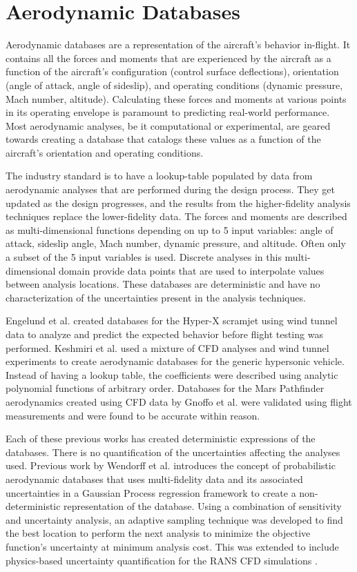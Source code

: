 \section{Aerodynamic Databases} \label{intro_databases}

Aerodynamic databases are a representation of the aircraft's behavior in-flight.
It contains all the forces and moments that are experienced by the aircraft as a function of the aircraft's configuration (control surface deflections), orientation (angle of attack, angle of sideslip), and operating conditions (dynamic pressure, Mach number, altitude).
Calculating these forces and moments at various points in its operating envelope is paramount to predicting real-world performance.
Most aerodynamic analyses, be it computational or experimental, are geared towards creating a database that catalogs these values as a function of the aircraft's orientation and operating conditions.

The industry standard is to have a lookup-table populated by data from aerodynamic analyses that are performed during the design process.
They get updated as the design progresses, and the results from the higher-fidelity analysis techniques replace the lower-fidelity data.
The forces and moments are described as multi-dimensional functions depending on up to 5 input variables: angle of attack, sideslip angle, Mach number, dynamic pressure, and altitude.
Often only a subset of the 5 input variables is used.
Discrete analyses in this multi-dimensional domain provide data points that are used to interpolate values between analysis locations.
These databases are deterministic and have no characterization of the uncertainties present in the analysis techniques. 

Engelund et al. \cite{engelund2001aerodynamic} created databases for the Hyper-X scramjet using wind tunnel data to analyze and predict the expected behavior before flight testing was performed.
Keshmiri et al. \cite{keshmiri2005development} used a mixture of CFD analyses and wind tunnel experiments to create aerodynamic databases for the generic hypersonic vehicle.
Instead of having a lookup table, the coefficients were described using analytic polynomial functions of arbitrary order. 
Databases for the Mars Pathfinder aerodynamics created using CFD data by Gnoffo et al. \cite{gnoffo1999prediction} were validated using flight measurements and were found to be accurate within reason.

Each of these previous works has created deterministic expressions of the databases.
There is no quantification of the uncertainties affecting the analyses used.
Previous work by Wendorff et al. \cite{wendorff_combining_2016} introduces the concept of probabilistic aerodynamic databases that uses multi-fidelity data and its associated uncertainties in a Gaussian Process regression framework to create a non-deterministic representation of the database.
Using a combination of sensitivity and uncertainty analysis, an adaptive sampling technique was developed to find the best location to perform the next analysis to minimize the objective function's uncertainty at minimum analysis cost.
This was extended to include physics-based uncertainty quantification for the RANS CFD simulations \cite{mukhopadhaya2020multi}.

